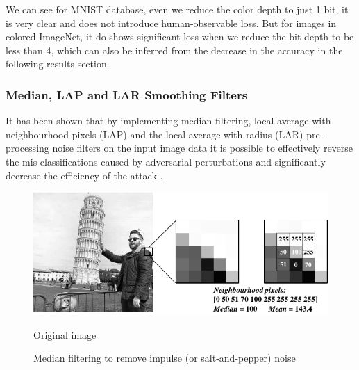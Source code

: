 We can see for MNIST database, even we reduce the color depth to just 1 bit, it is very clear and does not introduce human-observable loss. But for images in colored ImageNet, it do shows significant loss when we reduce the bit-depth to be less than 4, which can also be inferred from the decrease in the accuracy in the following results section. 


\subsubsection{Median, LAP and LAR Smoothing Filters}
It has been shown that by implementing median filtering, local average with neighbourhood pixels (LAP) and the local average with radius (LAR) pre-processing noise filters on the input image data it is possible to effectively reverse the mis-classifications caused by adversarial perturbations and significantly decrease the efficiency of the attack \cite{khalid2019fademl}. 

\begin{figure}[h!]
	\centering
		\includegraphics[width=.72\textwidth]{Diagram1-cropped.pdf}
		\caption{Original image}
		\label{fig: Median}
	\caption{Median filtering to remove impulse (or salt-and-pepper) noise}
\end{figure}



